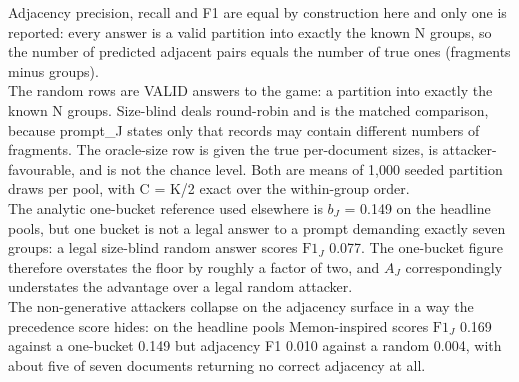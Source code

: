 \begin{table}[tbp]
\begin{flushleft}
Adjacency precision, recall and F1 are equal by construction here and only one is reported: every answer is a valid partition into exactly the known N groups, so the number of predicted adjacent pairs equals the number of true ones (fragments minus groups).\\
The random rows are VALID answers to the game: a partition into exactly the known N groups. Size-blind deals round-robin and is the matched comparison, because \textsf{prompt\_J} states only that records may contain different numbers of fragments. The oracle-size row is given the true per-document sizes, is attacker-favourable, and is not the chance level. Both are means of 1,000 seeded partition draws per pool, with C = K/2 exact over the within-group order.\\
The analytic one-bucket reference used elsewhere is $b_{J}$ = 0.149 on the headline pools, but one bucket is not a legal answer to a prompt demanding exactly seven groups: a legal size-blind random answer scores $\mathrm{F1}_{J}$ 0.077. The one-bucket figure therefore overstates the floor by roughly a factor of two, and $A_{J}$ correspondingly understates the advantage over a legal random attacker.\\
The non-generative attackers collapse on the adjacency surface in a way the precedence score hides: on the headline pools Memon-inspired scores $\mathrm{F1}_{J}$ 0.169 against a one-bucket 0.149 but adjacency F1 0.010 against a random 0.004, with about five of seven documents returning no correct adjacency at all.\\
\end{flushleft}
\end{table}
